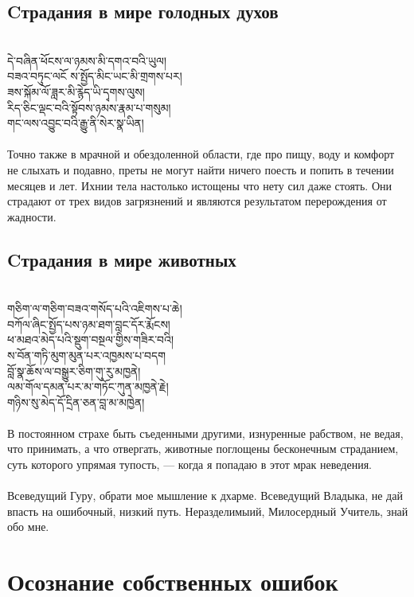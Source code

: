 \newpage
\subsection*{Cтрадания в мире голодных духов}
\\
\ti
དེ་བཞིན་ཕོངས་ལ་ཉམས་མི་དགའ་བའི་ཡུལ།\\
བཟའ་བཏུང་ལངོ ས་སྤྱོད་མིང་ཡང་མི་གྲགས་པར། \\
ཟས་སྐོམ་ལོ་ཟླར་མི་རྙེད་ཡི་དྭགས་ལུས། \\
རིད་ཅིང་ལྡང་བའི་སྟོབས་ཉམས་རྣམ་པ་གསུམ། \\
གང་ལས་འབྱུང་བའི་རྒྱུ་ནི་སེར་སྣ་ཡིན།\\
\\
\ru
Точно также в мрачной и обездоленной области,
где про пищу, воду и комфорт не слыхать и подавно,
преты не могут найти ничего поесть и попить в течении месяцев и лет.
Ихнии тела настолько истощены что нету сил даже стоять.
Они страдают от трех видов загрязнений и
являются результатом перерождения от жадности.

\subsection*{Cтрадания в мире животных}
\\
\ti
གཅིག་ལ་གཅིག་བཟའ་གསོད་པའི་འཇིགས་པ་ཆེ།\\
བཀོལ་ཞིང་སྤྱོད་པས་ཉམ་ཐག་བླང་དོར་རྨོངས། \\
ཕ་མཐའ་མེད་པའི་སྡུག་བསྔལ་གྱིས་གཟིར་བའི། \\
ས་བོན་གཏི་མུག་མུན་པར་འཁྱམས་པ་བདག \\
བློ་སྣ་ཆོས་ལ་བསྒྱུར་ཅིག་གུ་རུ་མཁྱནེ། \\
ལམ་གོལ་དམན་པར་མ་གཏོང་ཀུན་མཁྱནེ་རྗེ། \\
གཉིས་སུ་མེད་དོ་དྲིན་ཅན་བླ་མ་མཁྱེན།\\
\\
\ru
В постоянном страхе быть съеденными другими,
изнуренные рабством, не ведая, что принимать, а что отвергать,
животные поглощены бесконечным страданием,
суть которого упрямая тупость, — когда я попадаю в этот мрак неведения.\\
\\
Всеведущий Гуру, обрати мое мышление к дхарме.
Всеведущий Владыка, не дай впасть на ошибочный, низкий путь.
Нераздели\-мыий, Милосердный Учитель, знай обо мне.

\section*{Осознание собственных ошибок}
